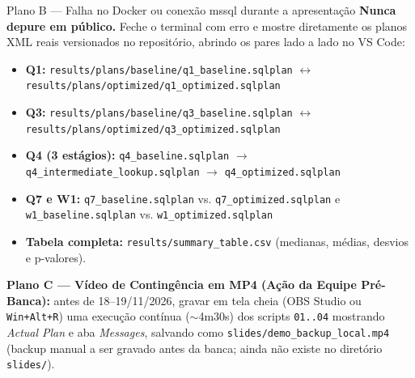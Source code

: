 \documentclass[10pt,a4paper]{article}
\begin{document}
\begin{passoBox}[DangerRed]{Plano B — Falha no Docker ou conexão mssql durante a apresentação}
\textbf{Nunca depure em público.} Feche o terminal com erro e mostre diretamente os planos XML reais versionados no repositório, abrindo os pares lado a lado no VS Code:
\begin{itemize}[leftmargin=14pt,itemsep=1pt,topsep=1pt,before=\raggedright]
  \item \textbf{Q1:} \texttt{results/plans/baseline/q1\_baseline.sqlplan} $\leftrightarrow$ \texttt{results/plans/optimized/q1\_optimized.sqlplan}
  \item \textbf{Q3:} \texttt{results/plans/baseline/q3\_baseline.sqlplan} $\leftrightarrow$ \texttt{results/plans/optimized/q3\_optimized.sqlplan}
  \item \textbf{Q4 (3 estágios):} \texttt{q4\_baseline.sqlplan} $\rightarrow$ \texttt{q4\_intermediate\_lookup.sqlplan} $\rightarrow$ \texttt{q4\_optimized.sqlplan}
  \item \textbf{Q7 e W1:} \texttt{q7\_baseline.sqlplan} vs. \texttt{q7\_optimized.sqlplan} e \texttt{w1\_baseline.sqlplan} vs. \texttt{w1\_optimized.sqlplan}
  \item \textbf{Tabela completa:} \texttt{results/summary\_table.csv} (medianas, médias, desvios e p-valores).
\end{itemize}
\end{passoBox}

\textbf{Plano C — Vídeo de Contingência em MP4 (Ação da Equipe Pré-Banca):} antes de 18--19/11/2026, gravar em tela cheia (OBS Studio ou \texttt{Win+Alt+R}) uma execução contínua ($\sim$4m30s) dos scripts \texttt{01..04} mostrando \emph{Actual Plan} e aba \emph{Messages}, salvando como \texttt{slides/demo\_backup\_local.mp4} (backup manual a ser gravado antes da banca; ainda não existe no diretório \texttt{slides/}).
\end{document}
